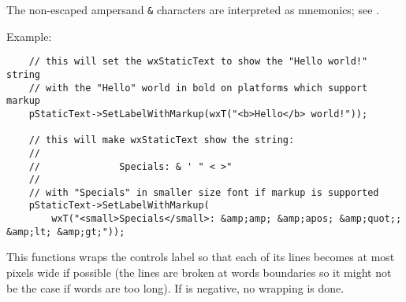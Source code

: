 The non-escaped ampersand \texttt{&} characters are interpreted as
mnemonics; see .


Example:

\begin{verbatim}
    // this will set the wxStaticText to show the "Hello world!" string
    // with the "Hello" world in bold on platforms which support markup
    pStaticText->SetLabelWithMarkup(wxT("<b>Hello</b> world!"));

    // this will make wxStaticText show the string:
    //
    //              Specials: & ' " < >"
    //
    // with "Specials" in smaller size font if markup is supported
    pStaticText->SetLabelWithMarkup(
        wxT("<small>Specials</small>: &amp;amp; &amp;apos; &amp;quot;; &amp;lt; &amp;gt;"));
\end{verbatim}





\label{wxstatictextwrap}


This functions wraps the controls label so that each of its lines becomes at
most  pixels wide if possible (the lines are broken at words
boundaries so it might not be the case if words are too long). If 
is negative, no wrapping is done.


